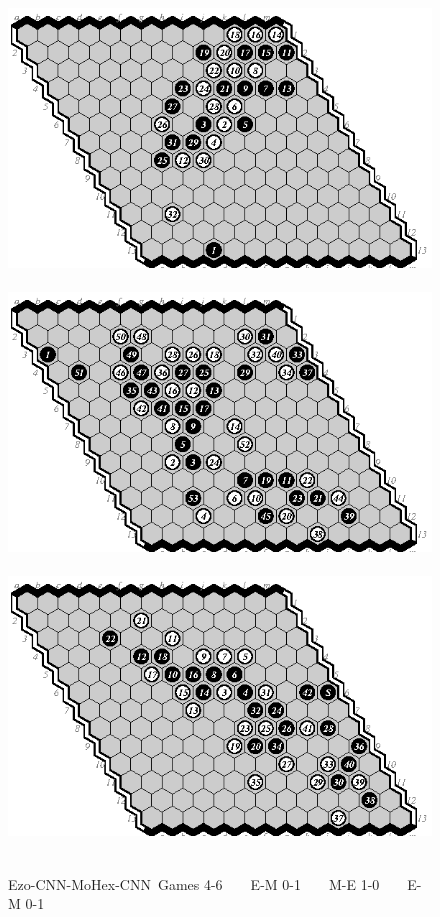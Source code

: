 \documentclass{icga}
\def\Ec{\mbox{\sc Ezo-CNN}}
\def\Mc{\mbox{\sc MoHex-CNN}}
\begin{document}
\begin{figure}[hbp]
\hspace*{-2cm}\
\includegraphics[scale=1]{pix/13.em4.eps}\hspace*{-2cm}\
\includegraphics[scale=1]{pix/13.me5.eps}\hspace*{-2cm}\
\includegraphics[scale=1]{pix/13.em6.eps}\hspace*{-2cm}\
\caption{\Ec{}-\Mc\ Games 4-6 ~ ~ E-M 0-1 ~ ~ M-E 1-0 ~ ~ E-M 0-1}
\end{figure}
\end{document}
